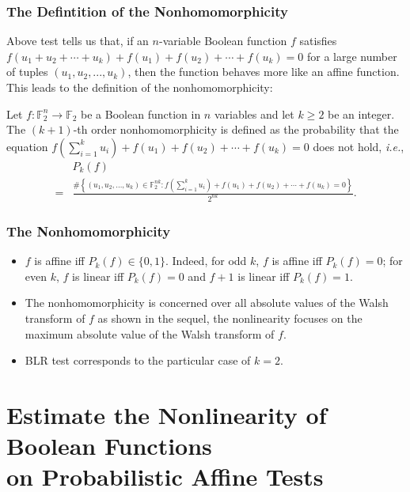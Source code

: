 \documentclass[
    aspectratio=169,                   %
]{beamer}
\newcommand{\F}{\mathbb{F}}
\begin{document}
    \begin{frame}
        \frametitle{The Defintition of the Nonhomomorphicity}

        Above test tells us that, if an $n$-variable Boolean function $f$ satisfies $f (u_1 +u_2+\cdots + u_k) + f (u_1) + f(u_2)+\cdots + f (u_k) = 0$ for a large number of tuples $(u_1,u_2,...,u_k)$, then the function behaves more like an affine function. 
        This leads to the definition of the nonhomomorphicity:
        \begin{definition}
            Let $f : \F_2^n\rightarrow \F_2$ be a Boolean function in $n$ variables and let $k\ge 2$ be an integer.
            The $(k + 1)$-th order nonhomomorphicity  is defined as the 
            probability that the equation $f (\sum_{i=1}^{k}u_i) + f (u_1) + f(u_2)+\cdots + f (u_k) = 0$ does not hold, \emph{i.e.},
            \begin{align*}
                &P_k(f)\\
                =&\frac{\#\left\{ (u_1,u_2,\dots,u_k)\in\F_2^{nk} :f (\sum_{i=1}^{k}u_i) + f (u_1) + f(u_2)+\cdots + f (u_k) = 0 \right\}}{2^{nk}}.
            \end{align*}
        \end{definition}
    
    \end{frame}
    \begin{frame}
        \frametitle{The Nonhomomorphicity}
    
        \begin{itemize}
            \item $f$ is affine iff $P_k(f)\in\{0,1\}$. Indeed, for odd $k$, $f$ is affine iff $P_k(f)=0$; for even $k$, $f$ is linear iff $P_k(f)=0$ and $f+1$ is linear iff $P_k(f)=1$.
            \item The nonhomomorphicity is concerned over all absolute values of the Walsh transform of $f$ as shown in the sequel, the nonlinearity focuses on the maximum absolute value of the Walsh transform of $f$.
            \item BLR test corresponds to the particular case of $k = 2$.
        \end{itemize}
    
    \end{frame}
\section{Estimate the Nonlinearity of Boolean Functions\\ on Probabilistic Affine Tests} 
\end{document}
